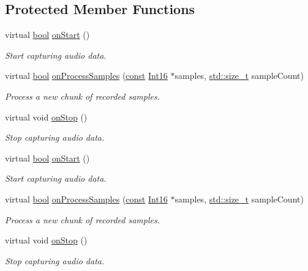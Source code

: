 \subsection*{Protected Member Functions}
\begin{DoxyCompactItemize}
\item 
virtual \hyperlink{term__entry_8h_a002004ba5d663f149f6c38064926abac}{bool} \hyperlink{classsf_1_1_sound_buffer_recorder_a531a7445fc8a48eaf9fc039c83f17c6f}{on\-Start} ()
\begin{DoxyCompactList}\small\item\em Start capturing audio data. \end{DoxyCompactList}\item 
virtual \hyperlink{term__entry_8h_a002004ba5d663f149f6c38064926abac}{bool} \hyperlink{classsf_1_1_sound_buffer_recorder_a9ceb94de14632ae8c1b78faf603b4767}{on\-Process\-Samples} (\hyperlink{term__entry_8h_a57bd63ce7f9a353488880e3de6692d5a}{const} \hyperlink{namespacesf_a3c8e10435e2a310a7741755e66b5c94e}{Int16} $\ast$samples, \hyperlink{nc__alloc_8h_a7b60c5629e55e8ec87a4547dd4abced4}{std\-::size\-\_\-t} sample\-Count)
\begin{DoxyCompactList}\small\item\em Process a new chunk of recorded samples. \end{DoxyCompactList}\item 
virtual void \hyperlink{classsf_1_1_sound_buffer_recorder_ab8e53849312413431873a5869d509f1e}{on\-Stop} ()
\begin{DoxyCompactList}\small\item\em Stop capturing audio data. \end{DoxyCompactList}\item 
virtual \hyperlink{term__entry_8h_a002004ba5d663f149f6c38064926abac}{bool} \hyperlink{classsf_1_1_sound_buffer_recorder_a531a7445fc8a48eaf9fc039c83f17c6f}{on\-Start} ()
\begin{DoxyCompactList}\small\item\em Start capturing audio data. \end{DoxyCompactList}\item 
virtual \hyperlink{term__entry_8h_a002004ba5d663f149f6c38064926abac}{bool} \hyperlink{classsf_1_1_sound_buffer_recorder_a9ceb94de14632ae8c1b78faf603b4767}{on\-Process\-Samples} (\hyperlink{term__entry_8h_a57bd63ce7f9a353488880e3de6692d5a}{const} \hyperlink{namespacesf_a3c8e10435e2a310a7741755e66b5c94e}{Int16} $\ast$samples, \hyperlink{nc__alloc_8h_a7b60c5629e55e8ec87a4547dd4abced4}{std\-::size\-\_\-t} sample\-Count)
\begin{DoxyCompactList}\small\item\em Process a new chunk of recorded samples. \end{DoxyCompactList}\item 
virtual void \hyperlink{classsf_1_1_sound_buffer_recorder_ab8e53849312413431873a5869d509f1e}{on\-Stop} ()
\begin{DoxyCompactList}\small\item\em Stop capturing audio data. \end{DoxyCompactList}\end{DoxyCompactItemize}
